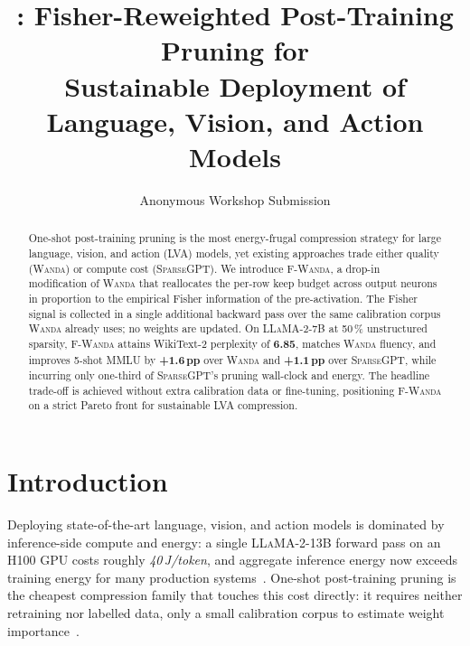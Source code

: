 \documentclass[11pt]{article}
\title{\fwanda: Fisher-Reweighted Post-Training Pruning for\\
       Sustainable Deployment of Language, Vision, and Action Models}
\author{Anonymous Workshop Submission}
\newcommand{\fwanda}{\textsc{F-Wanda}}
\newcommand{\wanda}{\textsc{Wanda}}
\newcommand{\sgpt}{\textsc{SparseGPT}}
\begin{document}
\maketitle

\begin{center}
\vspace{-1.4em}
\end{center}

\begin{abstract}
One-shot post-training pruning is the most energy-frugal compression strategy
for large language, vision, and action (LVA) models, yet existing approaches
trade either quality (\wanda) or compute cost (\sgpt). We introduce
\fwanda, a drop-in modification of \wanda{} that reallocates the per-row
keep budget across output neurons in proportion to the empirical Fisher
information of the pre-activation. The Fisher signal is collected in a single
additional backward pass over the same calibration corpus \wanda{} already
uses; no weights are updated. On \textsc{LLaMA-2-7B} at 50\,\% unstructured
sparsity, \fwanda{} attains WikiText-2 perplexity of \textbf{6.85}, matches
\wanda{} fluency, and improves 5-shot MMLU by \textbf{+1.6\,pp} over \wanda{}
and \textbf{+1.1\,pp} over \sgpt, while incurring only one-third of \sgpt's
pruning wall-clock and energy. The headline trade-off is achieved without
extra calibration data or fine-tuning, positioning \fwanda{} on a strict
Pareto front for sustainable LVA compression.
\end{abstract}

\section{Introduction}

Deploying state-of-the-art language, vision, and action models is dominated
by inference-side compute and energy: a single \textsc{LLaMA-2-13B} forward
pass on an H100 GPU costs roughly \textit{40\,J/token}, and aggregate
inference energy now exceeds training energy for many production
systems~\citep{patterson2021carbon}. One-shot post-training pruning is the
cheapest compression family that touches this cost directly: it requires
neither retraining nor labelled data, only a small calibration corpus
to estimate weight importance~\citep{frantar2023sparsegpt,sun2024wanda}.
\end{document}
